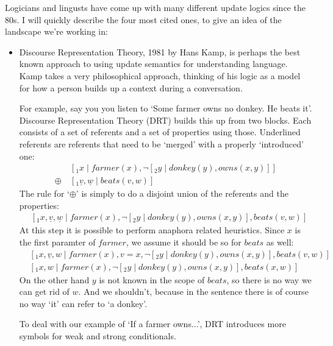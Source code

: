 \documentclass[12pt]{article}
\begin{document}
Logicians and lingusts have come up with many different update logics since the 80s. I will quickly describe the four most cited ones, to give an idea of the landscape we're working in:
%
\begin{itemize}
\item Discourse Representation Theory, 1981 by Hans Kamp\cite{kamp1981theory}, is perhaps the best known approach to using update semantics for understanding language. Kamp takes a very philosophical approach, thinking of his logic as a model for how a person builds up a context during a conversation.

For example, say you you listen to `Some farmer owns no donkey. He beats it'. Discourse Representation Theory (DRT) builds this up from two blocks. Each consists of a set of referents and a set of properties using those. Underlined referents are referents that need to be `merged' with a properly `introduced' one:
%
\begin{align}
&[_1 x\mid farmer(x), \neg[_2 y\mid donkey(y), owns(x,y)] ] \nonumber\\
\oplus\ & [_1 \underline{v}, \underline{w}\mid beats(v,w) ] \nonumber
\end{align}
%
The rule for `$\oplus$' is simply to do a disjoint union of the referents and the properties:
%
\begin{align}
&[_1 x, \underline{v}, \underline{w}\mid farmer(x), \neg[_2 y\mid donkey(y), owns(x,y)], beats(v,w) ] \nonumber
\end{align}
%
At this step it is possible to perform anaphora related heuristics. Since $x$ is the first paramter of $farmer$, we assume it should be so for $beats$ as well:
%
\begin{align}
&[_1 x, \underline{v}, w\mid farmer(x), v=x, \neg[_2 y\mid donkey(y), owns(x,y)], beats(v,w) ] \nonumber\\
&[_1 x, w\mid farmer(x), \neg[_2 y\mid donkey(y), owns(x,y)], beats(x,w) ]\nonumber
\end{align}
%
On the other hand $y$ is not known in the scope of $beats$, so there is no way we can get rid of $w$. And we shouldn't, because in the sentence there is of course no way `it' can refer to `a donkey'.

To deal with our example of `If a farmer owns...', DRT introduces more symbols for weak and strong conditionals.



\end{itemize}
\end{document}

